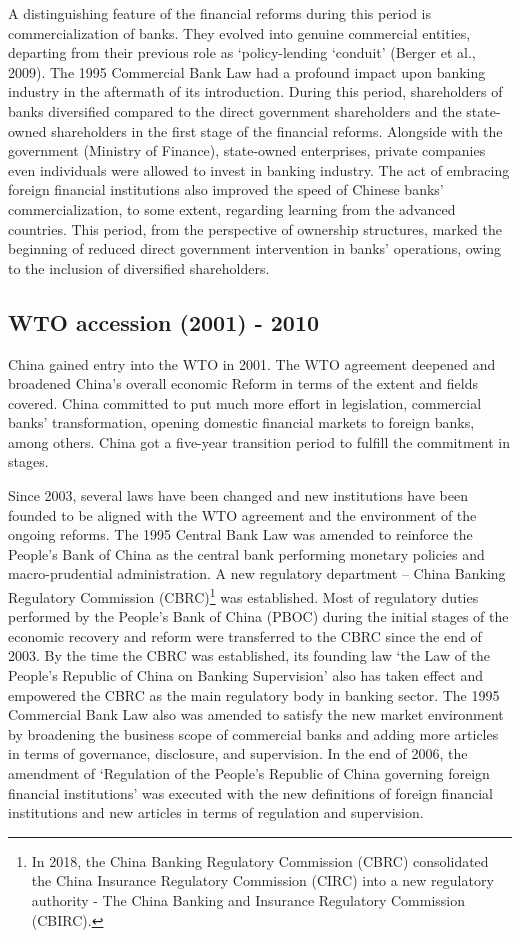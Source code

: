\documentclass[
  letterpaper,
  DIV=11,
  numbers=noendperiod]{scrreprt}
\begin{document}
A distinguishing feature of the financial reforms during this period is
commercialization of banks. They evolved into genuine commercial
entities, departing from their previous role as `policy-lending
`conduit' (Berger et al., 2009). The 1995 Commercial Bank Law had a
profound impact upon banking industry in the aftermath of its
introduction. During this period, shareholders of banks diversified
compared to the direct government shareholders and the state-owned
shareholders in the first stage of the financial reforms. Alongside with
the government (Ministry of Finance), state-owned enterprises, private
companies even individuals were allowed to invest in banking industry.
The act of embracing foreign financial institutions also improved the
speed of Chinese banks' commercialization, to some extent, regarding
learning from the advanced countries. This period, from the perspective
of ownership structures, marked the beginning of reduced direct
government intervention in banks' operations, owing to the inclusion of
diversified shareholders.

\subsection{WTO accession (2001) -
2010}\label{wto-accession-2001---2010}

China gained entry into the WTO in 2001. The WTO agreement deepened and
broadened China's overall economic Reform in terms of the extent and
fields covered. China committed to put much more effort in legislation,
commercial banks' transformation, opening domestic financial markets to
foreign banks, among others. China got a five-year transition period to
fulfill the commitment in stages.

Since 2003, several laws have been changed and new institutions have
been founded to be aligned with the WTO agreement and the environment of
the ongoing reforms. The 1995 Central Bank Law was amended to reinforce
the People's Bank of China as the central bank performing monetary
policies and macro-prudential administration. A new regulatory
department -- China Banking Regulatory Commission (CBRC)\footnote{In
  2018, the China Banking Regulatory Commission (CBRC) consolidated the
  China Insurance Regulatory Commission (CIRC) into a new regulatory
  authority - The China Banking and Insurance Regulatory Commission
  (CBIRC).} was established. Most of regulatory duties performed by the
People's Bank of China (PBOC) during the initial stages of the economic
recovery and reform were transferred to the CBRC since the end of 2003.
By the time the CBRC was established, its founding law `the Law of the
People's Republic of China on Banking Supervision' also has taken effect
and empowered the CBRC as the main regulatory body in banking sector.
The 1995 Commercial Bank Law also was amended to satisfy the new market
environment by broadening the business scope of commercial banks and
adding more articles in terms of governance, disclosure, and
supervision. In the end of 2006, the amendment of `Regulation of the
People's Republic of China governing foreign financial institutions' was
executed with the new definitions of foreign financial institutions and
new articles in terms of regulation and supervision.
\end{document}
